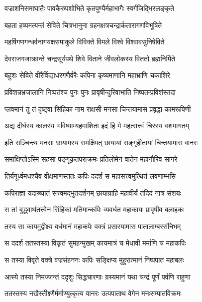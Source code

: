 \twolineshloka
{वज्राशनिसमाघातैः पावकैरुपशोभिते}
{कृतपुण्यैर्महाभागैः स्वर्गजिद्भिरलङ्कृते} %

\twolineshloka
{बहता हव्यमत्यन्तं सेविते चित्रभानुना}
{ग्रहनक्षत्रचन्द्रार्कतारागणविभूषिते} %

\twolineshloka
{महर्षिगणगन्धर्वनागयक्षसमाकुले}
{विविक्ते विमले विश्वे विश्वावसुनिषेविते} %

\twolineshloka
{देवराजगजाक्रान्ते चन्द्रसूर्यपथे शिवे}
{विताने जीवलोकस्य विततो ब्रह्मनिर्मिते} %

\twolineshloka
{बहुशः सेविते वीरैर्विद्याधरगणैर्वरैः}
{कपिना कृष्यमाणानि महाभ्राणि चकाशिरे} %

\twolineshloka
{प्रविशन्नभ्रजालानि निष्पतंश्च पुनः पुनः}
{प्रावृषीन्दुरिवाभाति निष्पतन्प्रविशंस्तदा} %

\twolineshloka
{प्लवमानं तु तं दृष्ट्वा सिंहिका नाम राक्षसी}
{मनसा चिन्तयामास प्रवृद्धा कामरूपिणी} %

\twolineshloka
{अद्य दीर्घस्य कालस्य भविष्याम्यहमाशिता}
{इदं हि मे महत्सत्त्वं चिरस्य वशमागतम्} %

\twolineshloka
{इति सञ्चिन्त्य मनसा छायामस्य समक्षिपत्}
{छायायां सङ्गृहीतायां चिन्तयामास वानरः} %

\twolineshloka
{समाक्षिप्तोऽस्मि सहसा पङ्गूकृतपराक्रमः}
{प्रतिलोमेन वातेन महानौरिव सागरे} %

\twolineshloka
{तिर्यगूर्ध्वमधश्चैव वीक्षमाणस्ततः कपिः}
{ददर्श स महासत्त्वमुत्थितं लवणाम्भसि} %

\twolineshloka
{कपिराज्ञा यदाख्यातं सत्त्वमद्भुतदर्शनम्}
{छायाग्राहि महावीर्यं तदिदं नात्र संशयः} %

\twolineshloka
{स तां बुद्ध्वार्थतत्त्वेन सिंहिकां मतिमान्कपिः}
{व्यवर्धत महाकायः प्रावृषीव बलाहकः} %

\twolineshloka
{तस्य सा कायमुद्वीक्ष्य वर्धमानं महाकपेः}
{वक्त्रं प्रसारयामास पातालाम्बरसंनिभम्} %

\twolineshloka
{स ददर्श ततस्तस्या विकृतं सुमहन्मुखम्}
{कायमात्रं च मेधावी मर्माणि च महाकपिः} %

\twolineshloka
{स तस्या विवृते वक्त्रे वज्रसंहननः कपिः}
{सङ्क्षिप्य मुहुरात्मानं निष्पपात महाबलः} %

\twolineshloka
{आस्ये तस्या निमज्जन्तं ददृशुः सिद्धचारणाः}
{ग्रस्यमानं यथा चन्द्रं पूर्णं पर्वणि राहुणा} %

\twolineshloka
{ततस्तस्य नखैस्तीक्ष्णैर्मर्माण्युत्कृत्य वानरः}
{उत्पपाताथ वेगेन मनःसम्पातविक्रमः} %

